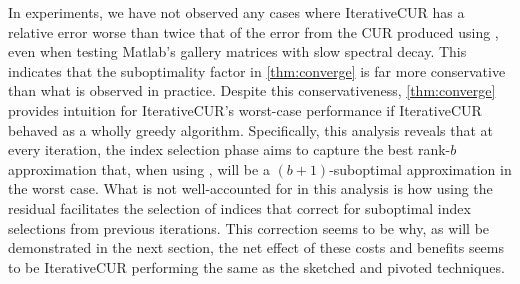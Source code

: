 In experiments, we have not observed any cases where IterativeCUR has a relative error worse than twice that of the error from the CUR produced using \cite{osinsky2025close}, even when testing Matlab's gallery matrices with slow spectral decay. This indicates that the suboptimality factor in \cref{thm:converge} is far more conservative than what is observed in practice.  Despite this conservativeness, \cref{thm:converge} provides intuition for IterativeCUR's worst-case performance if IterativeCUR behaved as a wholly greedy algorithm. Specifically, this analysis reveals that at every iteration, the index selection phase aims to capture the best rank-$b$ approximation that, when using \cite{osinsky2025close}, will be a $(b+1)$-suboptimal approximation in the worst case. What is not well-accounted for in this analysis is how using the residual facilitates the selection of indices that correct for suboptimal index selections from previous iterations. This correction seems to be why, as will be demonstrated in the next section, the net effect of these costs and benefits seems to be IterativeCUR performing the same as the sketched and pivoted techniques. 
